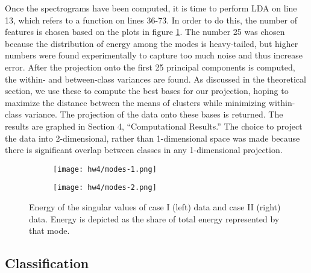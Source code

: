 \documentclass[a4paper,10 pt]{article}
\begin{document}
Once the spectrograms have been computed, it is time to perform LDA on line 13, which refers to a function on lines 36-73. In order to do this, the number of features is chosen based on the plots in figure \ref{fig:modes}. The number 25 was chosen because the distribution of energy among the modes is heavy-tailed, but higher numbers were found experimentally to capture too much noise and thus increase error. After the projection onto the first 25 principal components is computed, the within- and between-class variances are found. As discussed in the theoretical section, we use these to compute the best bases for our projection, hoping to maximize the distance between the means of clusters while minimizing within-class variance. The projection of the data onto these bases is returned. The results are graphed in Section 4, ``Computational Results.'' The choice to project the data into 2-dimensional, rather than 1-dimensional space was made because there is significant overlap between classes in any 1-dimensional projection.

\begin{figure}
    \centering
    \begin{minipage}{0.45\textwidth}
        \begin{figure}[H]
          \centering
            \texttt{[image: hw4/modes-1.png]}
        \end{figure}
    \end{minipage}\hfill
    \begin{minipage}{0.45\textwidth}
        \begin{figure}[H]
          \centering
            \texttt{[image: hw4/modes-2.png]}
        \end{figure}
    \end{minipage}
    \caption{Energy of the singular values of case I (left) data and case II (right) data. Energy is depicted as the share of total energy represented by that mode.}
    \label{fig:modes}
\end{figure}




\subsection{Classification}
\end{document}
